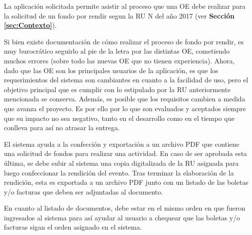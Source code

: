 La aplicación solicitada permite asistir al proceso que una OE debe realizar para la solicitud de un fondo por rendir segun la RU N del año 2017 (ver \textbf{Sección \ref{sec:Contexto}}).

Si bien existe documentación de cómo realizar el proceso de fondo por rendir, es muy burocrático seguirlo al pie de la letra por las distintas OE, cometiendo muchos errores (sobre todo las nuevas OE que no tienen experiencia). Ahora, dado que las OE son los principales usuarios de la aplicación, es que los requerimientos del sistema son cambiantes en cuanto a la facilidad de uso, pero el objetivo principal que es cumplir con lo estipulado por la RU anteriormente mencionada se conserva. Además, es posible que los requisitos cambien a medida que avanza el proyecto. Es por ello por lo que son evaluados y aceptados siempre que su impacto no sea negativo, tanto en el desarrollo como en el tiempo que conlleva para así no atrasar la entrega.

El sistema ayuda a la confección y exportación a un archivo PDF que contiene una solicitud de fondos para realizar una actividad. En caso de ser aprobada esta última, se debe subir al sistema una copia digitalizada de la RU asignada para luego confeccionar la rendición del evento. Tras terminar la elaboración de la rendición, esta es exportada a un archivo PDF junto con un listado de las boletas y/o facturas que deben ser adjuntadas al documento. 

En cuanto al listado de documentos, debe estar en el mismo orden en que fueron ingresados al sistema para así ayudar al usuario a chequear que las boletas y/o facturas sigan el orden asignado en el sistema.

